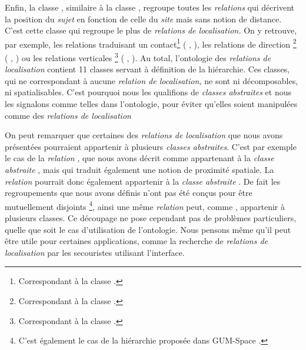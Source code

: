 Enfin, la classe
,
similaire à la classe
, regroupe
toutes les \emph{relations} qui décrivent la position du \emph{sujet}
en fonction de celle du \emph{site} mais sans notion de
distance. C'est cette classe qui regroupe le plus de \emph{relations
  de localisation.} On y retrouve, par exemple, les relations
traduisant un contact\footnote{Correspondant à la classe
  .} (\eg
{},
), les relations de direction
\footnote{Correspondant à la classe
  .} (\eg
{}, ) ou
les relations verticales \footnote{Correspondant à la classe
  .} (\eg
{}, ). Au
total, l'ontologie des \emph{relations de localisation} contient 11
classes servant à définition de la hiérarchie. Ces classes, qui ne
correspondant à aucune \emph{relation de localisation,} ne sont ni
décomposables, ni spatialisables. C'est pourquoi nous les qualifions
de \emph{classes abstraites} et nous les signalons comme telles dans
l'ontologie, pour éviter qu'elles soient manipulées comme des
\emph{relations de localisation} 

On peut remarquer que certaines des \emph{relations de localisation}
que nous avons présentées pourraient appartenir à plusieurs
\emph{classes abstraites}. C'est par exemple le cas de la
\emph{relation} , que nous avons décrit comme
appartenant à la \emph{classe abstraite}
, mais qui
traduit également une notion de proximité spatiale. La \emph{relation}
 pourrait donc également appartenir à la
\emph{classe abstraite}
. De fait les
regroupements que nous avons définis n'ont pas été conçus pour être
mutuellement disjoints \footnote{C'est également le cas de la
  hiérarchie proposée dans GUM-Space \autocite{Bateman2010}.}, ainsi
une même \emph{relation} peut, comme ,
appartenir à plusieurs classes. Ce découpage ne pose cependant pas de
problèmes particuliers, quelle que soit le cas d'utilisation de
l'ontologie. Nous pensons même qu'il peut être utile pour certaines
applications, comme la recherche de \emph{relations de localisation}
par les secouristes utilisant l'interface.

